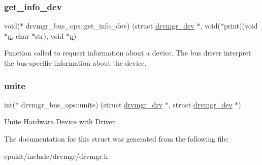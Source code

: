 \subsubsection{\texorpdfstring{get\_info\_dev}{get\_info\_dev}}
{\footnotesize\ttfamily void($\ast$ drvmgr\+\_\+bus\+\_\+ops\+::get\+\_\+info\+\_\+dev) (struct \mbox{\hyperlink{structdrvmgr__dev}{drvmgr\+\_\+dev}} $\ast$, void($\ast$print)(void $\ast$\mbox{\hyperlink{sun4u_2tte_8h_a27952ffc298d15b4fc0e7ee6b2a044ac}{p}}, char $\ast$str), void $\ast$\mbox{\hyperlink{sun4u_2tte_8h_a27952ffc298d15b4fc0e7ee6b2a044ac}{p}})}

Function called to request information about a device. The bus driver interpret the bus-\/specific information about the device. \mbox{\label{structdrvmgr__bus__ops_ac1aaf0f0581f7e816844a8eb622f54f8}} 
\subsubsection{\texorpdfstring{unite}{unite}}
{\footnotesize\ttfamily int($\ast$ drvmgr\+\_\+bus\+\_\+ops\+::unite) (struct \mbox{\hyperlink{structdrvmgr__drv}{drvmgr\+\_\+drv}} $\ast$, struct \mbox{\hyperlink{structdrvmgr__dev}{drvmgr\+\_\+dev}} $\ast$)}

Unite Hardware Device with Driver 

The documentation for this struct was generated from the following file\+:\begin{DoxyCompactItemize}
\item 
cpukit/include/drvmgr/drvmgr.\+h\end{DoxyCompactItemize}
